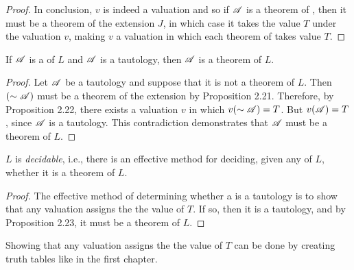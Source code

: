 \begin{proposition}
\begin{proof}
    In conclusion, \(v\) is indeed a valuation and so if \(\mathscr{A}\) is a theorem of \Lext{}, then it must be a theorem of the extension \(J\), in which case it takes the value \(T\) under the valuation \(v\), making \(v\) a valuation in which each theorem of \Lext{} takes value \(T\).
  \end{proof}
\end{proposition}

\begin{proposition}
  If \(\mathscr{A}\) is a \wf{} of \(L\) and \(\mathscr{A}\) is a tautology, then \(\mathscr{A}\) is a theorem of \(L\).

  \begin{proof}
    Let \(\mathscr{A}\) be a tautology and suppose that it is not a theorem of \(L\). Then \((\sim\mathscr{A})\) must be a theorem of the extension \Lext{} by Proposition 2.21. Therefore, by Proposition 2.22, there exists a valuation \(v\) in which \(v(\sim\mathscr{A}) = T\). But \(v(\mathscr{A}) = T\), since \(\mathscr{A}\) is a tautology. This contradiction demonstrates that \(\mathscr{A}\) must be a theorem of \(L\).
  \end{proof}
\end{proposition}

\begin{proposition}
  \(L\) is \textit{decidable}, i.e., there is an effective method for deciding, given any \wf{} of \(L\), whether it is a theorem of \(L\).

  \begin{proof}
    The effective method of determining whether a \wf{} is a tautology is to show that any valuation assigns the \wf{} the value of \(T\). If so, then it is a tautology, and by Proposition 2.23, it must be a theorem of \(L\).
  \end{proof}

  \note{} Showing that any valuation assigns the \wf{} the value of \(T\) can be done by creating truth tables like in the first chapter.
\end{proposition}

\solutions{}

